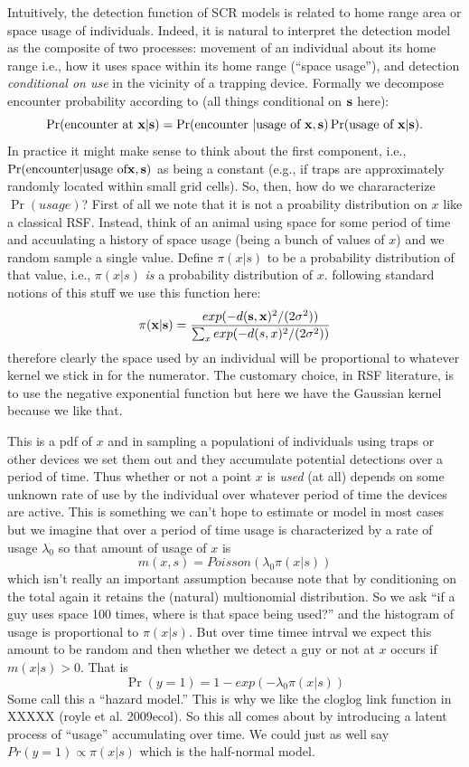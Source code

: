 Intuitively, the detection function of SCR models is related to home
range area or space usage of individuals.  Indeed, it is natural
to interpret the detection model as the composite of two processes:
movement of an individual about its home range i.e., how it uses space
within its home range (``space usage''), and detection {\it
  conditional on use} in the vicinity of a trapping device.
Formally we decompose encounter probability according
to (all things conditional on ${\bf s}$ here):
\[
 \Pr(\mbox{encounter at } {\bf x}|{\bf s})
 = \Pr(\mbox{encounter } | \mbox{usage of } {\bf x}, {\bf s}) 
\Pr(\mbox{usage of } {\bf x}|{\bf s}).
\]
In practice it might make sense to think about the first component,
i.e., $\Pr(\mbox{encounter} | \mbox{usage of} {\bf x}, {\bf s})$ as
being a constant (e.g., if traps are approximately randomly located within small
grid cells). So, then, 
how do we chararacterize $\Pr(usage)$?  First of all we note that it is
not a proability distribution on $x$ like a classical RSF. Instead,
think of an animal using space for some period of time and accuulating
a history of space usage (being a bunch of values of $x$) and we
random sample a single value. Define $\pi(x|s)$ to be a probability
distribution of that value, i.e., $\pi(x|s)$ {\it is} a probability
distribution of $x$. following standard notions of this stuff we
use this function here:
\[
\pi({\bf x}|{\bf s}) =  \frac{ exp(  -d({\bf s},{\bf x})^{2}/(2\sigma^{2})) }
{ \sum_{x} exp(  -d(s,x)^{2}/(2\sigma^{2})) }
\]
therefore clearly the space used by an individual will be proportional
to whatever kernel we stick in for the numerator. The customary
choice, in RSF literature, is to use the negative exponential function
but here we have the Gaussian kernel because we like that.

This is a pdf of $x$ and in sampling a populationi of individuals
using traps or other devices we set them out and they accumulate
potential detections over a period of time. Thus whether or not a
point $x$ is {\it used} (at all) depends on some unknown rate of use
by the individual over whatever period of time the devices are
active. This is something we can't hope to estimate or model in most
cases but we imagine that over a period of time usage is characterized
by a rate of usage $\lambda_{0}$ so that amount of usage of $x$ is
\[
m(x,s) = Poisson(\lambda_{0} \pi(x|s) ) 
\]
which isn't really an important assumption because note that by
conditioning on the total again it retains the (natural) multionomial
distribution. So we ask ``if a guy uses space 100 times, where is that
space being used?'' and the histogram of usage is proportional to
$\pi(x|s)$. But over time timee intrval we expect this amount to be
random and then whether we detect a guy or not at $x$ occurs if
$m(x|s)>0$. That is
\[
\Pr(y=1) = 1-exp(-\lambda_{0} \pi(x|s))
\]
Some call this a ``hazard model.''  This is why we like the cloglog
link function in XXXXX (royle et al. 2009ecol).
So this all comes about by introducing a latent process of ``usage''
accumulating over time.    
We could just as well say $Pr(y=1) \propto \pi(x|s)$ which is the
half-normal model. 


